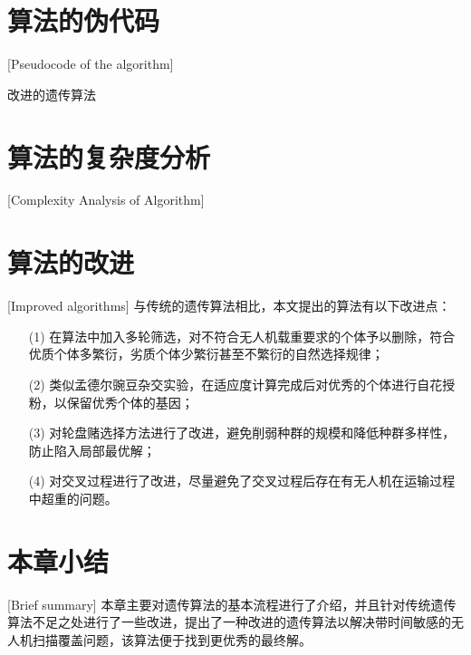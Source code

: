 \section{算法的伪代码}[Pseudocode of the algorithm]
\begin{algorithm}[H]
\caption{改进的遗传算法}
\LinesNumbered %
\end{algorithm}

\section{算法的复杂度分析}[Complexity Analysis of Algorithm]

\section{算法的改进}[Improved algorithms]
与传统的遗传算法相比，本文提出的算法有以下改进点：
\begin{itemize}
	\item [(1)] 在算法中加入多轮筛选，对不符合无人机载重要求的个体予以删除，符合优质个体多繁衍，劣质个体少繁衍甚至不繁衍的自然选择规律；
	\item [(2)] 类似孟德尔豌豆杂交实验，在适应度计算完成后对优秀的个体进行自花授粉，以保留优秀个体的基因；
	\item [(3)] 对轮盘赌选择方法进行了改进，避免削弱种群的规模和降低种群多样性，防止陷入局部最优解；
 	\item [(4)] 对交叉过程进行了改进，尽量避免了交叉过程后存在有无人机在运输过程中超重的问题。
\end{itemize}
\section{本章小结}[Brief summary]
本章主要对遗传算法的基本流程进行了介绍，并且针对传统遗传算法不足之处进行了一些改进，提出了一种改进的遗传算法以解决带时间敏感的无人机扫描覆盖问题，该算法便于找到更优秀的最终解。